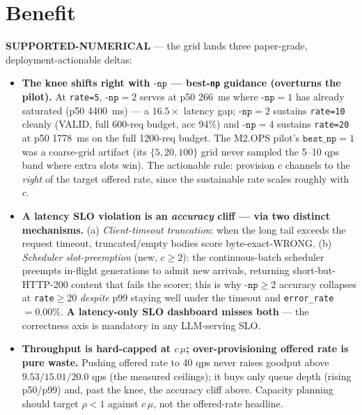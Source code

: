 \documentclass[11pt,a4paper]{article}
\begin{document}
\section{Benefit}
\label{sec:benefit}
\textcolor{green!50!black}{\textbf{SUPPORTED-NUMERICAL}} --- the grid lands three
paper-grade, deployment-actionable deltas:

\begin{itemize}
  \item \textbf{The knee shifts right with \(\texttt{-np}\) --- best-\texttt{np}
    guidance (overturns the pilot).} At \texttt{rate=5}, \(\texttt{-np}{=}2\)
    serves at p50 \SI{266}{\milli\second} where \(\texttt{-np}{=}1\) has already
    saturated (p50 \SI{4400}{\milli\second}) --- a \(16.5\times\) latency gap;
    \(\texttt{-np}{=}2\) sustains \texttt{rate=10} cleanly (VALID, full 600-req
    budget, acc 94\%) and \(\texttt{-np}{=}4\) sustains \texttt{rate=20} at p50
    \SI{1778}{\milli\second} on the full 1200-req budget. The M2.OPS pilot's
    \(\texttt{best\_np}{=}1\) was a coarse-grid artifact (its \(\{5,20,100\}\)
    grid never sampled the 5--10 qps band where extra slots win). The actionable
    rule: provision \(c\) channels to the \emph{right} of the target offered
    rate, since the sustainable rate scales roughly with \(c\).
  \item \textbf{A latency SLO violation is an \emph{accuracy} cliff --- via two
    distinct mechanisms.} (a) \emph{Client-timeout truncation}: when the long
    tail exceeds the request timeout, truncated/empty bodies score
    byte-exact-WRONG. (b) \emph{Scheduler slot-preemption} (new, \(c\ge 2\)):
    the continuous-batch scheduler preempts in-flight generations to admit new
    arrivals, returning short-but-HTTP-200 content that fails the scorer; this
    is why \(\texttt{-np}\ge 2\) accuracy collapses at \texttt{rate}\(\ge 20\)
    \emph{despite} p99 staying well under the timeout and \texttt{error\_rate}
    \(=0.00\%\). \textbf{A latency-only SLO dashboard misses both} --- the
    correctness axis is mandatory in any LLM-serving SLO.
  \item \textbf{Throughput is hard-capped at \(c\,\mu\); over-provisioning
    offered rate is pure waste.} Pushing offered rate to 40 qps never raises
    goodput above \(9.53/15.01/20.0\) qps (the measured ceilings); it buys only
    queue depth (rising p50/p99) and, past the knee, the accuracy cliff above.
    Capacity planning should target \(\rho < 1\) against \(c\,\mu\), not the
    offered-rate headline.
\end{itemize}
\end{document}
